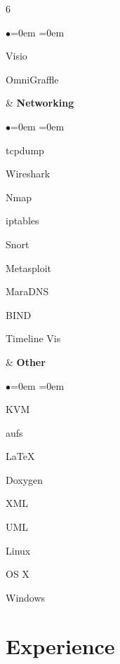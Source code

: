 \documentclass[margin,line]{resume}
\newenvironment{skills}{
  \begin{list}{\small$\bullet$}{\leftmargin=0em \itemindent=0em \small}
}{
  \end{list}
}
\begin{document}
\begin{resume}
\begin{ncolumn}{6}
\begin{skills}
  \item[] Visio
  \item[] OmniGraffle
  \end{skills}
&
{\bf Networking}
  \begin{skills}
  \item[] tcpdump
  \item[] Wireshark
  \item[] Nmap
  \item[] iptables
  \item[] Snort
  \item[] Metasploit
  \item[] MaraDNS
  \item[] BIND
  \item[] Timeline Vis
  \end{skills}
&
{\bf Other}
  \begin{skills}
  \item[] KVM
  \item[] aufs
  \item[] \LaTeX
  \item[] Doxygen
  \item[] XML
  \item[] UML
  \item[] Linux
  \item[] OS X
  \item[] Windows
  \end{skills}
\end{ncolumn}

\section{Experience}


\end{resume}
\end{document}
